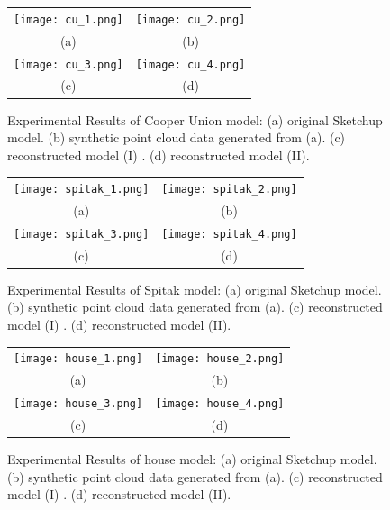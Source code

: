 \begin{figure} [htbp]
\begin{center}
\begin{tabular}{cc}
\texttt{[image: cu\_1.png]} &
\texttt{[image: cu\_2.png]} \\
(a) & (b) \\
\texttt{[image: cu\_3.png]} &
\texttt{[image: cu\_4.png]} \\
(c) & (d)
\end{tabular}
\end{center}
\caption{Experimental Results of Cooper Union model:
      (a) original Sketchup model.
      (b) synthetic point cloud data generated from (a).
      (c) reconstructed model (I) .
      (d) reconstructed model (II).}
\label{fig:ER_Fig1}
\end{figure}

\begin{figure} [htbp]
\begin{center}
\begin{tabular}{cc}
\texttt{[image: spitak\_1.png]} &
\texttt{[image: spitak\_2.png]} \\
(a) & (b) \\
\texttt{[image: spitak\_3.png]} &
\texttt{[image: spitak\_4.png]} \\
(c) & (d)
\end{tabular}
\end{center}
\caption{Experimental Results of Spitak model:
      (a) original Sketchup model.
      (b) synthetic point cloud data generated from (a).
      (c) reconstructed model (I) .
      (d) reconstructed model (II).}
\label{fig:ER_Fig2}
\end{figure}

\begin{figure} [htbp]
\begin{center}
\begin{tabular}{cc}
\texttt{[image: house\_1.png]} &
\texttt{[image: house\_2.png]} \\
(a) & (b) \\
\texttt{[image: house\_3.png]} &
\texttt{[image: house\_4.png]} \\
(c) & (d)
\end{tabular}
\end{center}
\caption{Experimental Results of house model:
      (a) original Sketchup model.
      (b) synthetic point cloud data generated from (a).
      (c) reconstructed model (I) .
      (d) reconstructed model (II).}
\label{fig:ER_Fig3}
\end{figure}


